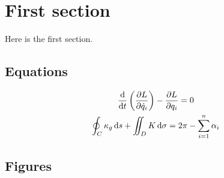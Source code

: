 \documentclass{article}
\begin{document}
\title{}
\author{}
\date{}
\fi

\section{First section}

Here is the first section.

\subsection{Equations}

\begin{gather}
    \frac{\mathop{}\!\mathrm{d}{}}{\mathop{}\!\mathrm{d} t}\left(\frac{\partial L}{\partial \dot q_i}\right)-\frac{\partial L}{\partial q_i}=0\\
    \oint_C \kappa_g\mathop{}\!\mathrm{d} s+\iint_D K\mathop{}\!\mathrm{d}\sigma=2\pi-\sum_{i=1}^n\alpha_i
\end{gather}

\subsection{Figures}
\end{document}
